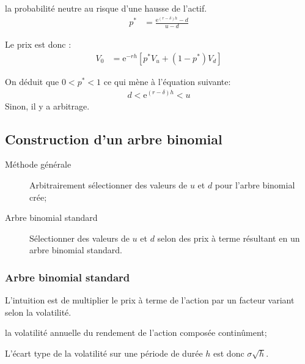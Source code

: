 \documentclass[10pt, french]{article}
\begin{document}
\begin{multicols*}{2}
\begin{distributions}[Notation]
\begin{description}[leftmargin = *]
	\item[$p^{*}$]	la probabilité neutre au risque d'une hausse de l'actif.
		\begin{align*}
		p^{*}	&=	\frac{\textrm{e}^{(r - \delta)h} - d}{u - d}
		\end{align*}
\end{description}
Le prix est donc :
	\begin{align*}
	V_{0}	&=	\textrm{e}^{-rh} \left[p^{*} V_{u} + (1 - p^{*})V_{d} \right]
	\end{align*}
\end{distributions}

On déduit que $0 < p^{*} < 1$ ce qui mène à l'équation suivante:
	\begin{align*}
	d < \textrm{e}^{(r - \delta)h} < u
	\end{align*}
Sinon, il y a arbitrage.

\columnbreak
\subsection{Construction d'un arbre binomial}

\begin{description}
	\item[Méthode générale]	Arbitrairement sélectionner des valeurs de $u$ et $d$ pour l'arbre binomial crée;
	\item[Arbre binomial standard]	Sélectionner des valeurs de $u$ et $d$ selon des prix à terme résultant en un arbre binomial standard.
\end{description}

\subsubsection*{Arbre binomial standard}
L'intuition est de multiplier le prix à terme de l'action par un facteur variant selon la volatilité.

\begin{distributions}[Notation]
\begin{description}[leftmargin = *]
	\item[$\sigma$]	la volatilité annuelle du rendement de l'action composée continûment;
	\item[]	L'écart type de la volatilité sur une période de durée $h$ est donc $\sigma \sqrt{h}$.
\end{description}
\end{distributions}


\end{multicols*}
\end{document}
